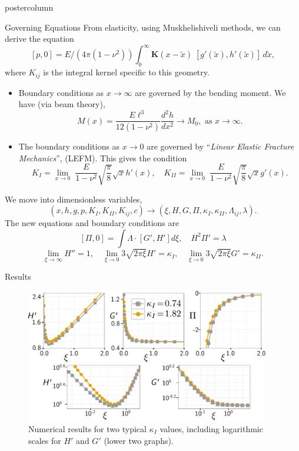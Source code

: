 \documentclass{beamer}
\begin{document}
\begin{frame}
\begin{columns}
\begin{column}{.43\textwidth}
\begin{beamercolorbox}[center]{postercolumn}
\begin{minipage}{.98\textwidth}
{\begin{myblock}{Governing Equations}
From elasticity, using Muskhelishiveli methods, we can derive the equation
\[
\left[ p,  0 \right]   =
E/(4\pi (1-\nu^2)) \int_0^{\infty}
\textbf{K}(x-\tilde{x}) \;
\left[ g'(\tilde{x}) , h'(\tilde{x}) \right] \, d\tilde{x},  \]
where $K_{ij}$ is the integral kernel specific to this geometry.
\begin{itemize}
\item Boundary conditions as $x\to\infty$ are governed by the bending moment.
      We have (via beam theory), 
      \[ M(x) = \frac{E\ell^3}{12(1-\nu^2)}\frac{d^2h}{dx^2} \to M_0,
        \mbox{ as } x \to \infty. \]
\item The boundary conditions as $x\to0$ are governed by ``\emph{Linear Elastic
      Fracture Mechanics}'', (LEFM). This gives the condition
      \[K_I = \lim_{x\to 0} \; \frac{E}{1-\nu^2}\sqrt{\frac{\pi}{8}} \sqrt{x}
      h'(x), \quad K_{II} = \lim_{x\to 0} \; \frac{E}{1-\nu^2}
      \sqrt{\frac{\pi}{8}} \sqrt{x} g'(x). \]
\end{itemize}
We move into dimensionless variables, 
\[(x,h,g,p,K_I,K_{II},K_{ij},c) \to (\xi, H,G,\Pi, \kappa_{I},\kappa_{II}, 
\Lambda_{ij},\lambda). \]
The new equations and boundary conditions are
\[[\Pi,0] = \int \Lambda \cdot [G',H'] d\xi, \quad H^2\Pi' = \lambda\]
\[\lim_{\xi \to \infty} H'' = 1, \quad \lim_{\xi \to 0} 3\sqrt{2\pi\xi}H' 
= \kappa_I,  \quad \lim_{\xi \to 0} 3\sqrt{2\pi\xi}G' 
= \kappa_{II}. \]
\end{myblock}\vfill
\begin{myblock}{Results}
\begin{figure}
\centering\includegraphics[width=0.95\textwidth]{hprime-p-x-full-poster.pdf}
\caption{Numerical results for two typical $\kappa_I$ values, including
         logarithmic scales for $H'$ and $G'$ (lower two graphs).}
\end{figure}
\end{myblock}\vfill
}
\end{minipage}
\end{beamercolorbox}
\end{column}
\end{columns}
\end{frame}
\end{document}
